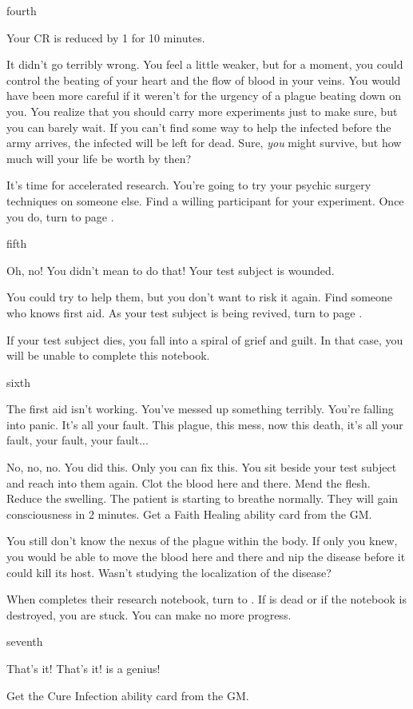 \documentclass[greennotebook]{Pestilence} %
\begin{document}
\begin{page}{fourth}

Your CR is reduced by 1 for 10 minutes.

It didn't go terribly wrong. You feel a little weaker, but for a moment, you could control the beating of your heart and the flow of blood in your veins. You would have been more careful if it weren't for the urgency of a plague beating down on you. You realize that you should carry more experiments just to make sure, but you can barely wait. If you can't find some way to help the infected before the army arrives, the infected will be left for dead. Sure, \textit{you} might survive, but how much will your life be worth by then?

It's time for accelerated research. You're going to try your psychic surgery techniques on someone else. Find a willing participant for your experiment. Once you do, turn to page .

\end{page}

\begin{page}{fifth}

Oh, no! You didn't mean to do that! Your test subject is wounded.

You could try to help them, but you don't want to risk it again. Find someone who knows first aid. As your test subject is being revived, turn to page . 

If your test subject dies, you fall into a spiral of grief and guilt. In that case, you will be unable to complete this notebook.

\end{page}

\begin{page}{sixth}

The first aid isn't working. You've messed up something terribly. You're falling into panic. It's all your fault. This plague, this mess, now this death, it's all your fault, your fault, your fault...

No, no, no. You did this. Only you can fix this. You sit beside your test subject and reach into them again. Clot the blood here and there. Mend the flesh. Reduce the swelling. The patient is starting to breathe normally. They will gain consciousness in 2 minutes. Get a Faith Healing ability card from the GM. 

You still don't know the nexus of the plague within the body. If only you knew, you would be able to move the blood here and there and nip the disease before it could kill its host. Wasn't \cOutsider{} studying the localization of the disease?

When \cOutsider{} completes their research notebook, turn to . If \cOutsider{} is dead or if the notebook is destroyed, you are stuck. You can make no more progress.

\end{page}

\begin{page}{seventh}

That's it! That's it! \cOutsider{} is a genius!

Get the Cure Infection ability card from the GM.

\end{page}

\endnotebook
\end{document}
